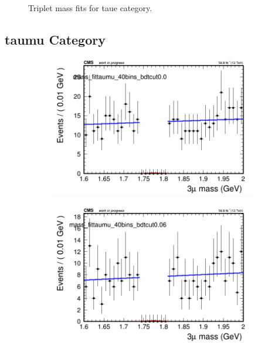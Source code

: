 \begin{figure}[H]
\begin{subfigure}{0.2\textwidth}
        \caption{}
    \end{subfigure}
    \caption{Triplet mass fits for taue category.}
    \label{fig:powerlawtaue}
\end{figure}

\subsection{taumu Category}
\label{sec:powerlawtaumu}

\begin{figure}[H]
    \centering
    \begin{subfigure}{0.2\textwidth}
        \includegraphics[width=\textwidth]{power_law/plots/taumu/massfit_taumu_40bins_bdtcut0.0.png}
        \caption{}
    \end{subfigure}
    \begin{subfigure}{0.2\textwidth}
        \includegraphics[width=\textwidth]{power_law/plots/taumu/massfit_taumu_40bins_bdtcut0.06.png}

\end{subfigure}
\end{figure}
